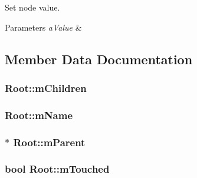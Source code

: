 Set node value. 


\begin{DoxyParams}{Parameters}
{\em a\+Value} & \\
\hline
\end{DoxyParams}


\subsection{Member Data Documentation}
\subsubsection[{\texorpdfstring{m\+Children}{mChildren}}]{ Root\+::m\+Children\hspace{0.3cm}{\ttfamily [private]}}\hypertarget{classRoot_aface52589cb6e6e464ab70d90d3dc807}{}\label{classRoot_aface52589cb6e6e464ab70d90d3dc807}
\subsubsection[{\texorpdfstring{m\+Name}{mName}}]{ Root\+::m\+Name\hspace{0.3cm}{\ttfamily [private]}}\hypertarget{classRoot_adc6338ef170b1c0e07c6e50bd0571515}{}\label{classRoot_adc6338ef170b1c0e07c6e50bd0571515}
\subsubsection[{\texorpdfstring{m\+Parent}{mParent}}]{$\ast$ Root\+::m\+Parent\hspace{0.3cm}{\ttfamily [private]}}\hypertarget{classRoot_af38e126b7b80124a9ca0d0c1f3076f2d}{}\label{classRoot_af38e126b7b80124a9ca0d0c1f3076f2d}
\subsubsection[{\texorpdfstring{m\+Touched}{mTouched}}]{\setlength{\rightskip}{0pt plus 5cm}bool Root\+::m\+Touched\hspace{0.3cm}{\ttfamily [private]}}\hypertarget{classRoot_ad85ad4d959d7808ce715802dbaea51e8}{}\label{classRoot_ad85ad4d959d7808ce715802dbaea51e8}
